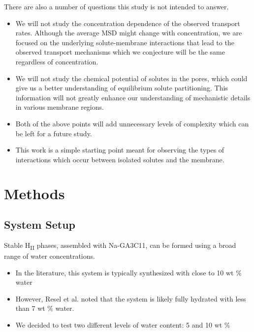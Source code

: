 \documentclass{article}
\begin{document}
  \noindent There are also a number of questions this study is not intended 
  to answer.
  \begin{itemize}
    \item We will not study the concentration dependence of the observed
    transport rates. Although the average MSD might change with concentration,
    we are focused on the underlying solute-membrane interactions that lead to
    the observed transport mechanisms which we conjecture will be the same 
    regardless of concentration.
    \item We will not study the chemical potential of solutes in the pores, which
    could give us a better understanding of equilibrium solute partitioning.
    This information will not greatly enhance our understanding of 
    mechanistic details in various membrane regions.
    \item Both of the above points will add unnecessary levels of complexity
    which can be left for a future study. 
    \item This work is a simple starting point meant for observing the types
    of interactions which occur between isolated solutes and the membrane.
  \end{itemize}

  \section{Methods}
  
  \subsection*{System Setup}

  Stable H\textsubscript{II} phases, assembled with Na-GA3C11, can be formed
  using a broad range of water concentrations.
  \begin{itemize}
	\item In the literature, this system is typically synthesized with close
	to 10 wt \% water \cite{smith_ordered_1997, zhou_new_2007}
    \item However, Resel et al. noted that the system is likely fully 
	hydrated with less than 7 wt \% water. \cite{resel_h2-phase_2000}
	\item We decided to test two different levels of water content: 5 and 10 wt \%
  \end{itemize} 
\end{document}
